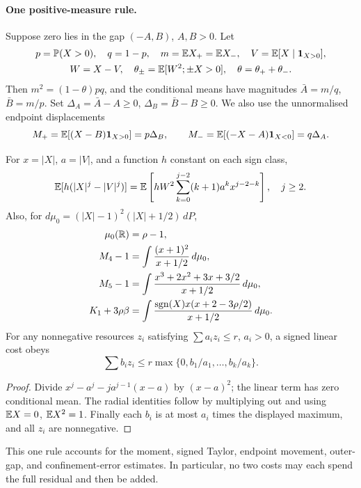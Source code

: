 \paragraph{One positive-measure rule.}
Suppose zero lies in the gap $(-A,B)$, $A,B>0$. Let
\[\begin{gathered}
 p=\mathbb P(X>0),\quad q=1-p,\quad m=\mathbb E X_+=\mathbb E X_-,\quad V=\mathbb E[X\mid\mathbf1_{X>0}],\\
 W=X-V,\quad\theta_\pm=\mathbb E[W^2;\pm X>0],\quad\theta=\theta_++\theta_-.
\end{gathered}\]
Then $m^2=(1-\theta)pq$, and the conditional means have magnitudes
$\bar A=m/q$, $\bar B=m/p$. Set
$\Delta_A=\bar A-A\ge0$, $\Delta_B=\bar B-B\ge0$.
We also use the unnormalised endpoint displacements
\[
 M_+=\mathbb E[(X-B)\mathbf1_{X>0}]=p\Delta_B,\qquad
 M_-=\mathbb E[(-X-A)\mathbf1_{X<0}]=q\Delta_A.
\]

\begin{lemma}\label{j:local:re:pricing}
For $x=|X|$, $a=|V|$, and a function $h$ constant on each sign class,
\begin{equation}\label{j:local:re:conditional}
 \mathbb E[h(|X|^j-|V|^j)]
 =\mathbb E\left[hW^2\sum_{k=0}^{j-2}(k+1)a^kx^{j-2-k}\right],\quad j\ge2.
\end{equation}
Also, for $d\mu_0=(|X|-1)^2(|X|+1/2)\,dP$,
\begin{align*}
 \mu_0(\mathbb R)&=\rho-1,\\
 M_4-1&=\int\frac{(x+1)^2}{x+1/2}\,d\mu_0,\\
 M_5-1&=\int\frac{x^3+2x^2+3x+3/2}{x+1/2}\,d\mu_0,\\
 K_1+3\rho\beta&=\int
  \frac{\operatorname{sgn}(X)x(x+2-3\rho/2)}{x+1/2}\,d\mu_0.
\end{align*}
For any nonnegative resources $z_i$ satisfying $\sum a_i z_i\le r$,
$a_i>0$, a signed linear cost obeys
\begin{equation}\label{j:local:re:simplex}
 \sum b_i z_i\le r\max\{0,b_1/a_1,\ldots,b_k/a_k\}.
\end{equation}
\end{lemma}
\begin{proof}
Divide $x^j-a^j-ja^{j-1}(x-a)$ by $(x-a)^2$; the linear term has
zero conditional mean. The radial identities follow by multiplying
out and using $\mathbb E X=0$, $\mathbb E X^2=1$. Finally each $b_i$ is at most
$a_i$ times the displayed maximum, and all $z_i$ are nonnegative.
\end{proof}

This one rule accounts for the moment, signed Taylor, endpoint movement,
outer-gap, and confinement-error estimates. In particular, no two costs
may each spend the full residual and then be added.




